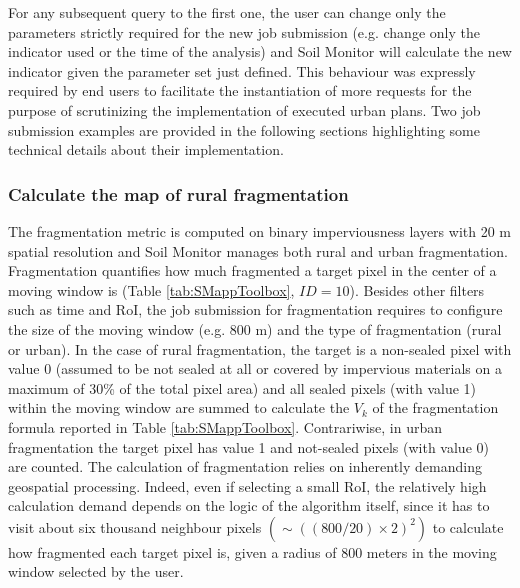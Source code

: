 \documentclass[APA,LATO1COL,doublespace]{WileyNJD-v2}
\newcommand{\toberevised}[1]{\emph{\textcolor{red}{#1}}} %
\begin{document}
For any subsequent query to the first one, the user can change only the parameters strictly required for the new job submission (e.g. change only the indicator used or the time of the analysis) and Soil Monitor will calculate the new indicator given the parameter set just defined. 
This behaviour was expressly required by end users to facilitate the instantiation of more requests for the purpose of scrutinizing the implementation of executed urban plans.
Two job submission examples are provided in the following sections highlighting some technical details about their implementation.

\subsubsection{Calculate the map of rural fragmentation}
\label{sec:mmFragmentation}
The fragmentation metric is computed on binary imperviousness layers with 20 m spatial resolution and Soil Monitor manages both rural and urban fragmentation.
Fragmentation quantifies how much fragmented %
a target pixel in the center of a moving window is (Table \ref{tab:SMappToolbox}, $ID = 10$).
Besides other filters such as time and RoI, the job submission for fragmentation requires to configure the size of the moving window (e.g. 800 m) and the type of fragmentation (rural or urban).
In the case of rural fragmentation, the target is a non-sealed pixel with value 0 (assumed to be not sealed at all or covered by impervious materials on a maximum of 30\% of the total pixel area) and all sealed pixels (with value 1) within the moving window are summed to calculate the $V_k$ of the fragmentation formula reported in Table \ref{tab:SMappToolbox}.
Contrariwise, in urban fragmentation the target pixel has value 1 and not-sealed pixels (with value 0) are counted.
The calculation of fragmentation relies on inherently demanding geospatial processing.
Indeed, even if selecting a small RoI, the relatively high calculation demand depends on the logic of the algorithm itself, since it has to visit about six thousand neighbour pixels $\left( \sim \left( \left(800/20\right)\times2 \right)^2 \right)$ to calculate how fragmented each target pixel is, given a radius of 800 meters in the moving window selected by the user.
\end{document}
